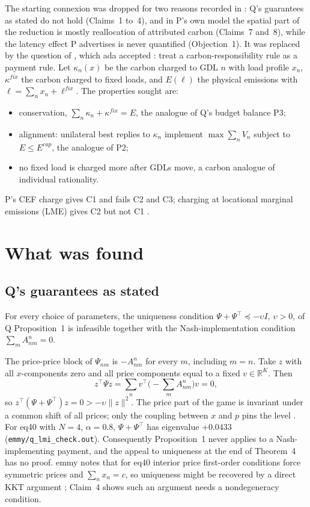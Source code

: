 \documentclass{article}
\begin{document}
The starting connexion was dropped for two reasons recorded in : Q's guarantees as stated do not hold (Claims~1 to~4), and in P's own model the spatial part of the reduction is mostly reallocation of attributed carbon (Claims~7 and~8), while the latency effect P advertises is never quantified (Objection~1). It was replaced by the question of , which ada accepted : treat a carbon-responsibility rule as a payment rule. Let \(\kappa_n(x)\) be the carbon charged to GDL \(n\) with load profile \(x_n\), \(\kappa^{fix}\) the carbon charged to fixed loads, and \(E(\ell)\) the physical emissions with \(\ell=\sum_nx_n+\ell^{fix}\). The properties sought are:
\begin{itemize}
\item[(C1)] conservation, \(\sum_n\kappa_n+\kappa^{fix}=E\), the analogue of Q's budget balance P3;
\item[(C2)] alignment: unilateral best replies to \(\kappa_n\) implement \(\max\sum_nV_n\) subject to \(E\le E^{cap}\), the analogue of P2;
\item[(C3)] no fixed load is charged more after GDLs move, a carbon analogue of individual rationality.
\end{itemize}
P's CEF charge gives C1 and fails C2 and C3; charging at locational marginal emissions (LME) gives C2 but not C1 .

\section{What was found}

\subsection{Q's guarantees as stated}

\begin{claim}[P1 (ii) contradicts P2 (i)]
For every choice of parameters, the uniqueness condition \(\Psi+\Psi^\top\preceq-\upsilon I\), \(\upsilon>0\), of Q Proposition~1 is infeasible together with the Nash-implementation condition \(\sum_mA^n_{nm}=0\). 
\end{claim}

The price-price block of \(\Psi_{nm}\) is \(-A^n_{nm}\) for every \(m\), including \(m=n\). Take \(z\) with all \(x\)-components zero and all price components equal to a fixed \(v\in\mathbb{R}^K\). Then
\[
z^\top\Psi z=\sum_n v^\top\Big(-\sum_mA^n_{nm}\Big)v=0,
\]
so \(z^\top(\Psi+\Psi^\top)z=0>-\upsilon\|z\|^2\). The price part of the game is invariant under a common shift of all prices; only the coupling between \(x\) and \(p\) pins the level . For eq40 with \(N=4\), \(\alpha=0.8\), \(\Psi+\Psi^\top\) has eigenvalue \(+0.0433\) (\texttt{emmy/q\_lmi\_check.out}). Consequently Proposition~1 never applies to a Nash-implementing payment, and the appeal to uniqueness at the end of Theorem~4 has no proof. emmy notes that for eq40 interior price first-order conditions force symmetric prices and \(\sum_nx_n=c\), so uniqueness might be recovered by a direct KKT argument ; Claim~4 shows such an argument needs a nondegeneracy condition.
\end{document}
